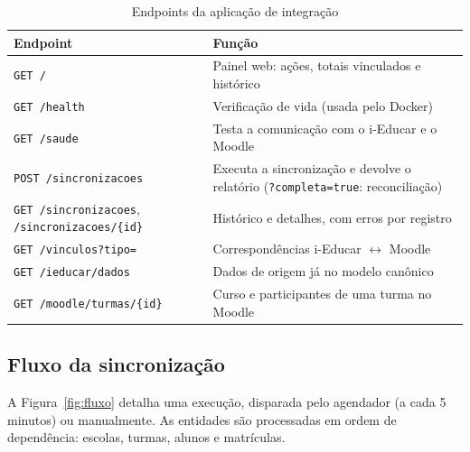 \documentclass[12pt]{article}
\newcommand{\cod}[1]{\texttt{#1}}
\begin{document}
\begin{table}[H]
\centering
\caption{Endpoints da aplicação de integração}
\label{tab:endpoints}
\footnotesize
\begin{tabularx}{\linewidth}{>{\raggedright\arraybackslash}p{6.3cm}>{\raggedright\arraybackslash}X}
\toprule
\textbf{Endpoint} & \textbf{Função} \\
\midrule
\cod{GET /} & Painel web: ações, totais vinculados e histórico \\
\cod{GET /health} & Verificação de vida (usada pelo Docker) \\
\cod{GET /saude} & Testa a comunicação com o i-Educar e o Moodle \\
\cod{POST /sincronizacoes} & Executa a sincronização e devolve o relatório (\cod{?completa=true}: reconciliação) \\
\cod{GET /sincronizacoes}, \cod{/sincronizacoes/\{id\}} & Histórico e detalhes, com erros por registro \\
\cod{GET /vinculos?tipo=} & Correspondências i-Educar $\leftrightarrow$ Moodle \\
\cod{GET /ieducar/dados} & Dados de origem já no modelo canônico \\
\cod{GET /moodle/turmas/\{id\}} & Curso e participantes de uma turma no Moodle \\
\bottomrule
\end{tabularx}
\end{table}

\subsection{Fluxo da sincronização}

A Figura~\ref{fig:fluxo} detalha uma execução, disparada pelo agendador (a
cada 5 minutos) ou manualmente. As entidades são processadas em ordem de
dependência: escolas, turmas, alunos e matrículas.
\end{document}
